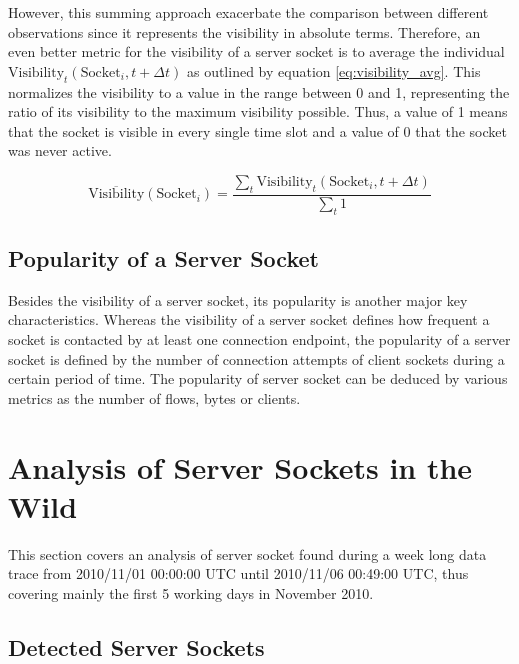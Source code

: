 However, this summing approach exacerbate the comparison between different 
observations since it represents the visibility in absolute terms. Therefore, an 
even better metric for the visibility of a \gls{server socket} is to average the 
individual $\text{Visibility}_t(\text{Socket}_i,t+\Delta{t})$ as outlined by 
equation \ref{eq:visibility_avg}. This normalizes the visibility to a value in 
the range between 0 and 1, representing the ratio of its visibility to the 
maximum visibility possible. Thus, a value of 1 means that the socket is visible 
in every single time slot and a value of 0 that the socket was never active. 

\begin{equation}
	\overline{\text{Visibility}}(\text{Socket}_i) = \frac{\sum_{t} \text{Visibility}_t(\text{Socket}_i,t+\Delta{t})}{\sum_{t}1}
	\label{eq:visibility_avg} 
\end{equation}

\subsection{Popularity of a Server Socket}

Besides the visibility of a \gls{server socket}, its popularity is another major 
key characteristics. Whereas the visibility of a \gls{server socket} defines how 
frequent a socket is contacted by at least one connection endpoint, the 
popularity of a \gls{server socket} is defined by the number of connection 
attempts of client sockets during a certain period of time. The popularity of 
\gls{server socket} can be deduced by various metrics as the number of flows, 
bytes or clients.


\section{Analysis of Server Sockets in the Wild}

This section covers an analysis of \gls{server socket} found during a 
week long data trace from 2010/11/01 00:00:00 UTC until 2010/11/06 00:49:00 UTC, 
thus covering mainly the first 5 working days in November 2010.

\subsection{Detected Server Sockets}

